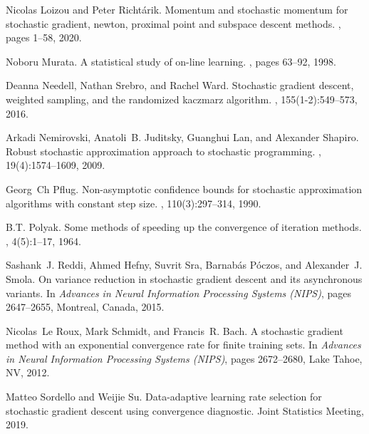 \documentclass[conference]{IEEEtran}
\begin{document}
\begin{thebibliography}{10}
Nicolas Loizou and Peter Richt{\'a}rik.
\newblock Momentum and stochastic momentum for stochastic gradient, newton,
  proximal point and subspace descent methods.
, pages 1--58, 2020.

Noboru Murata.
\newblock A statistical study of on-line learning.
, pages 63--92, 1998.

Deanna Needell, Nathan Srebro, and Rachel Ward.
\newblock Stochastic gradient descent, weighted sampling, and the randomized
  kaczmarz algorithm.
, 155(1-2):549--573, 2016.

Arkadi Nemirovski, Anatoli~B. Juditsky, Guanghui Lan, and Alexander Shapiro.
\newblock Robust stochastic approximation approach to stochastic programming.
, 19(4):1574--1609, 2009.

Georg~Ch Pflug.
\newblock Non-asymptotic confidence bounds for stochastic approximation
  algorithms with constant step size.
, 110(3):297--314, 1990.

B.T. Polyak.
\newblock Some methods of speeding up the convergence of iteration methods.
,
  4(5):1--17, 1964.

Sashank~J. Reddi, Ahmed Hefny, Suvrit Sra, Barnab{\'{a}}s P{\'{o}}czos, and
  Alexander~J. Smola.
\newblock On variance reduction in stochastic gradient descent and its
  asynchronous variants.
\newblock In {\em Advances in Neural Information Processing Systems (NIPS)},
  pages 2647--2655, Montreal, Canada, 2015.

Nicolas~Le Roux, Mark Schmidt, and Francis~R. Bach.
\newblock A stochastic gradient method with an exponential convergence rate for
  finite training sets.
\newblock In {\em Advances in Neural Information Processing Systems (NIPS)},
  pages 2672--2680, Lake Tahoe, NV, 2012.

Matteo Sordello and Weijie Su.
\newblock Data-adaptive learning rate selection for stochastic gradient descent
  using convergence diagnostic.
\newblock Joint Statistics Meeting, 2019.


\end{thebibliography}
\end{document}
